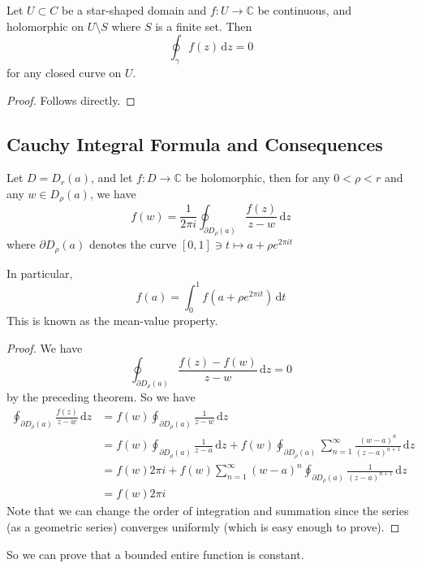 \begin{corollary}
    Let $U\subset C$ be a star-shaped domain and $f:U\to\mathbb C$ be continuous, and holomorphic on $U\setminus S$ where $S$ is a finite set.
    Then
    $$\oint_\gamma f(z)\,\mathrm dz=0$$
    for any closed curve on $U$.
\end{corollary}
\begin{proof}
    Follows directly.
\end{proof}
\subsection{Cauchy Integral Formula and Consequences}
\begin{theorem}
    Let $D=D_r(a)$, and let $f:D\to\mathbb C$ be holomorphic, then for any $0<\rho<r$ and any $w\in D_\rho(a)$, we have
    $$f(w)=\frac{1}{2\pi i}\oint_{\partial D_\rho(a)}\frac{f(z)}{z-w}\,\mathrm dz$$
    where $\partial D_\rho(a)$ denotes the curve $[0,1]\ni t\mapsto a+\rho e^{2\pi it}$
\end{theorem}
In particular,
$$f(a)=\int_0^1 f(a+\rho e^{2\pi it})\,\mathrm dt$$
This is known as the mean-value property.
\begin{proof}
    We have
    $$\oint_{\partial D_\rho(a)}\frac{f(z)-f(w)}{z-w}\,\mathrm dz=0$$
    by the preceding theorem.
    So we have
    \begin{align*}
        \oint_{\partial D_\rho(a)}\frac{f(z)}{z-w}\,\mathrm dz&=f(w)\oint_{\partial D_\rho(a)}\frac{1}{z-w}\,\mathrm dz\\
        &=f(w)\oint_{\partial D_\rho(a)}\frac{1}{z-a}\,\mathrm dz+f(w)\oint_{\partial D_\rho(a)}\sum_{n=1}^\infty\frac{(w-a)^n}{(z-a)^{n+1}}\,\mathrm dz\\
        &=f(w)2\pi i+f(w)\sum_{n=1}^\infty(w-a)^n\oint_{\partial D_\rho(a)}\frac{1}{(z-a)^{n+1}}\,\mathrm dz\\
        &=f(w)2\pi i
    \end{align*}
    Note that we can change the order of integration and summation since the series (as a geometric series) converges uniformly (which is easy enough to prove).
\end{proof}
So we can prove that a bounded entire function is constant.
